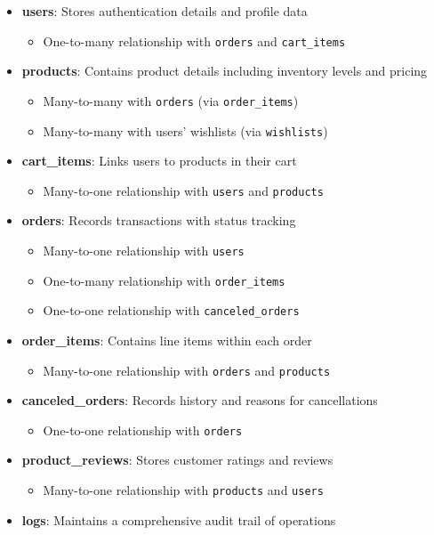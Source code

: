 \documentclass{article}
\begin{document}
\begin{itemize}
    \item \textbf{users}: Stores authentication details and profile data
        \begin{itemize}
            \item One-to-many relationship with \texttt{orders} and \texttt{cart\_items}
        \end{itemize}
    \item \textbf{products}: Contains product details including inventory levels and pricing
        \begin{itemize}
            \item Many-to-many with \texttt{orders} (via \texttt{order\_items})
            \item Many-to-many with users' wishlists (via \texttt{wishlists})
        \end{itemize}
    \item \textbf{cart\_items}: Links users to products in their cart
        \begin{itemize}
            \item Many-to-one relationship with \texttt{users} and \texttt{products}
        \end{itemize}
    \item \textbf{orders}: Records transactions with status tracking
        \begin{itemize}
            \item Many-to-one relationship with \texttt{users}
            \item One-to-many relationship with \texttt{order\_items}
            \item One-to-one relationship with \texttt{canceled\_orders}
        \end{itemize}
    \item \textbf{order\_items}: Contains line items within each order
        \begin{itemize}
            \item Many-to-one relationship with \texttt{orders} and \texttt{products}
        \end{itemize}
    \item \textbf{canceled\_orders}: Records history and reasons for cancellations
        \begin{itemize}
            \item One-to-one relationship with \texttt{orders}
        \end{itemize}
    \item \textbf{product\_reviews}: Stores customer ratings and reviews
        \begin{itemize}
            \item Many-to-one relationship with \texttt{products} and \texttt{users}
        \end{itemize}
    \item \textbf{logs}: Maintains a comprehensive audit trail of operations
\end{itemize}
\end{document}
